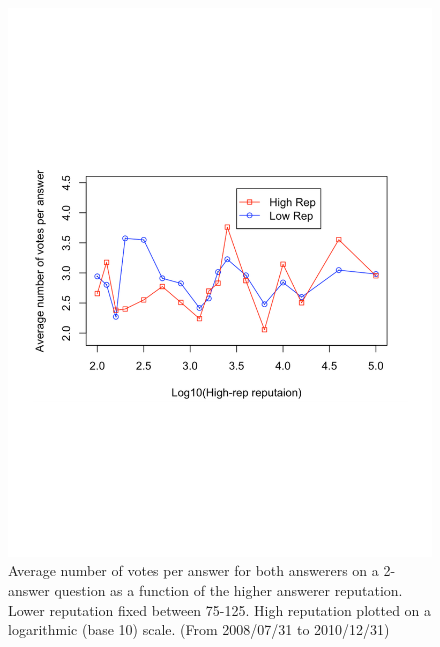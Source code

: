\begin{figure}[!t]
    \centering
    \includegraphics[width=0.8\columnwidth]{img/Fig6_2010.pdf}
    \caption{Average number of votes per answer for both answerers on a 2-answer question as a function of the higher answerer reputation. Lower reputation fixed between 75-125. High reputation plotted on a logarithmic (base 10) scale. (From 2008/07/31 to 2010/12/31)}
    \label{fig:fig6_2010}
\end{figure}

